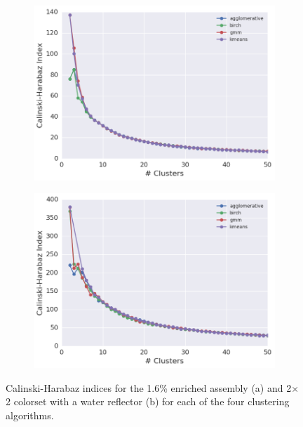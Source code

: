 \begin{figure}[h!]
\centering
\begin{subfigure}{\textwidth}
  \centering
  \includegraphics[width=0.9\linewidth]{figures/results/model-select/assm-16/ch-combined-U238-capture-1}
  \caption{}
  \label{fig:chap11-assm-16-ch-index}
\end{subfigure}
\begin{subfigure}{\textwidth}
  \centering
  \includegraphics[width=0.9\linewidth]{figures/results/model-select/reflector/ch-combined-U238-nu-fission-1}
  \caption{}
\label{fig:chap11-refl-ch-index}
\end{subfigure}
\caption[Calinski-Harabaz indices]{Calinski-Harabaz indices for the 1.6\% enriched assembly (a) and 2$\times$2 colorset with a water reflector (b) for each of the four clustering algorithms.}
\label{fig:chap11-ch-indices}
\end{figure}

